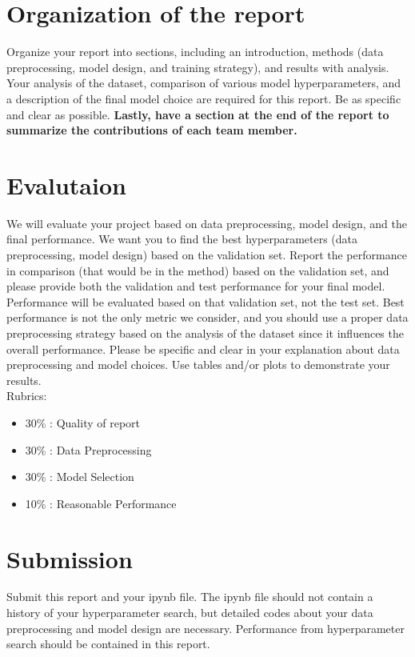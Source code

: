 \documentclass{article}
\begin{document}
\section{Organization of the report}

Organize your report into sections, including an introduction, methods (data preprocessing, model design, and training strategy), and results with analysis.
Your analysis of the dataset, comparison of various model hyperparameters, and a description of the final model choice are required for this report.
Be as specific and clear as possible.
\textbf{Lastly, have a section at the end of the report to summarize the contributions of each team member.}


\section{Evalutaion}

We will evaluate your project based on data preprocessing, model design, and the final performance.
We want you to find the best hyperparameters (data preprocessing, model design) based on the validation set.
Report the performance in comparison (that would be in the method) based on the validation set, and please provide both the validation and test performance for your final model.
Performance will be evaluated based on that validation set, not the test set.
Best performance is not the only metric we consider, and you should use a proper data preprocessing strategy based on the analysis of the dataset since it influences the overall performance.
Please be specific and clear in your explanation about data preprocessing and model choices.
Use tables and/or plots to demonstrate your results. \\

Rubrics:
\begin{itemize}
    \item 30\% : Quality of report
    \item 30\% : Data Preprocessing
    \item 30\% : Model Selection
    \item 10\% : Reasonable Performance
\end{itemize}



\section{Submission}

Submit this report and your ipynb file.
The ipynb file should not contain a history of your hyperparameter search, but detailed codes about your data preprocessing and model design are necessary.
Performance from hyperparameter search should be contained in this report.






\end{document}
